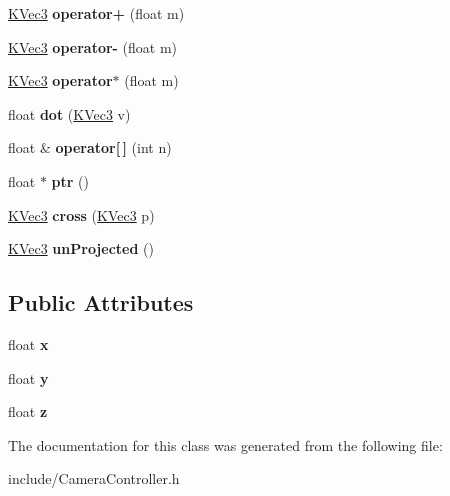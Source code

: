 \begin{DoxyCompactItemize}
\item 
\hypertarget{class_k_vec3_acb07aa5a91ddb147f781ef3724f0794d}{
\hyperlink{class_k_vec3}{KVec3} {\bfseries operator+} (float m)}
\label{class_k_vec3_acb07aa5a91ddb147f781ef3724f0794d}

\item 
\hypertarget{class_k_vec3_ab30256626784dd96d02947b75b77a709}{
\hyperlink{class_k_vec3}{KVec3} {\bfseries operator-\/} (float m)}
\label{class_k_vec3_ab30256626784dd96d02947b75b77a709}

\item 
\hypertarget{class_k_vec3_ac06b93a214c0b1f5d54240a1012d925f}{
\hyperlink{class_k_vec3}{KVec3} {\bfseries operator$\ast$} (float m)}
\label{class_k_vec3_ac06b93a214c0b1f5d54240a1012d925f}

\item 
\hypertarget{class_k_vec3_a83daaec316fabf0b0bef1f9cd5668229}{
float {\bfseries dot} (\hyperlink{class_k_vec3}{KVec3} v)}
\label{class_k_vec3_a83daaec316fabf0b0bef1f9cd5668229}

\item 
\hypertarget{class_k_vec3_a3f1f2f8e05ef143dc8f43765e5541ae8}{
float \& {\bfseries operator\mbox{[}$\,$\mbox{]}} (int n)}
\label{class_k_vec3_a3f1f2f8e05ef143dc8f43765e5541ae8}

\item 
\hypertarget{class_k_vec3_aa2e54f77cdb43a5714de8788020eb4f1}{
float $\ast$ {\bfseries ptr} ()}
\label{class_k_vec3_aa2e54f77cdb43a5714de8788020eb4f1}

\item 
\hypertarget{class_k_vec3_ae80c2a68d3c80e8d72f54a57c0d2e1f1}{
\hyperlink{class_k_vec3}{KVec3} {\bfseries cross} (\hyperlink{class_k_vec3}{KVec3} p)}
\label{class_k_vec3_ae80c2a68d3c80e8d72f54a57c0d2e1f1}

\item 
\hypertarget{class_k_vec3_ad70071220ddb797ce5665908f2d95297}{
\hyperlink{class_k_vec3}{KVec3} {\bfseries unProjected} ()}
\label{class_k_vec3_ad70071220ddb797ce5665908f2d95297}

\end{DoxyCompactItemize}
\subsection*{Public Attributes}
\begin{DoxyCompactItemize}
\item 
\hypertarget{class_k_vec3_a8ce6092e44ca9559ea94a326ebab9c2d}{
float {\bfseries x}}
\label{class_k_vec3_a8ce6092e44ca9559ea94a326ebab9c2d}

\item 
\hypertarget{class_k_vec3_a05e2802e6cef45c1f735c83785118a99}{
float {\bfseries y}}
\label{class_k_vec3_a05e2802e6cef45c1f735c83785118a99}

\item 
\hypertarget{class_k_vec3_aee77dec1ef49152679fb873e8445b9f8}{
float {\bfseries z}}
\label{class_k_vec3_aee77dec1ef49152679fb873e8445b9f8}

\end{DoxyCompactItemize}


The documentation for this class was generated from the following file:\begin{DoxyCompactItemize}
\item 
include/CameraController.h\end{DoxyCompactItemize}

